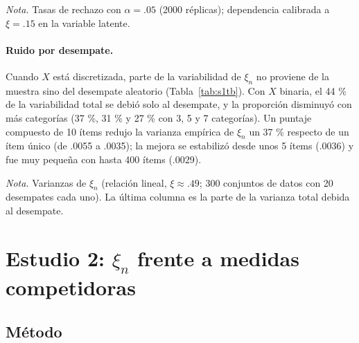 \documentclass[man,donotrepeattitle,floatsintext]{apa7}
\begin{document}
\begin{table}
\caption{Potencia de $\xi_n$ según la discretización de $X$ ($Y$ continua)}
\label{tab:s1x}
\begin{threeparttable}
\small

\begin{tablenotes}[flushleft]
\small
\item \textit{Nota.} Tasas de rechazo con $\alpha=.05$ (2000 réplicas); dependencia calibrada a $\xi=.15$ en la variable latente.
\end{tablenotes}
\end{threeparttable}
\end{table}

\paragraph{Ruido por desempate.} Cuando $X$ está discretizada, parte de la variabilidad de $\xi_n$ no proviene de la muestra sino del desempate aleatorio (Tabla~\ref{tab:s1tb}). Con $X$ binaria, el 44 \% de la variabilidad total se debió solo al desempate, y la proporción disminuyó con más categorías (37 \%, 31 \% y 27 \% con 3, 5 y 7 categorías). Un puntaje compuesto de 10 ítems redujo la varianza empírica de $\xi_n$ un 37 \% respecto de un ítem único (de .0055 a .0035); la mejora se estabilizó desde unos 5 ítems (.0036) y fue muy pequeña con hasta 400 ítems (.0029).

\begin{table}
\caption{Variabilidad de $\xi_n$ entre conjuntos de datos y por desempate aleatorio ($n=100$)}
\label{tab:s1tb}
\begin{threeparttable}
\small

\begin{tablenotes}[flushleft]
\small
\item \textit{Nota.} Varianzas de $\xi_n$ (relación lineal, $\xi\approx .49$; 300 conjuntos de datos con 20 desempates cada uno). La última columna es la parte de la varianza total debida al desempate.
\end{tablenotes}
\end{threeparttable}
\end{table}

\section{Estudio 2: $\xi_n$ frente a medidas competidoras}

\subsection{Método}
\end{document}
